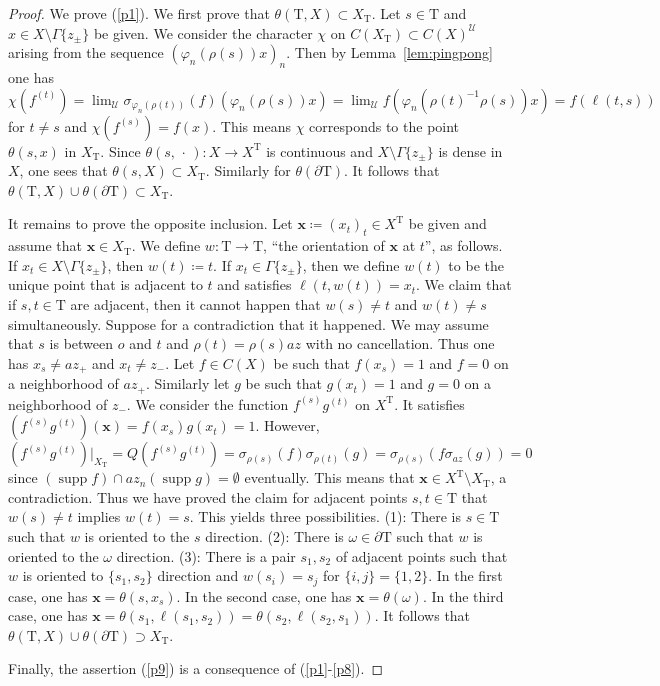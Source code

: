 \documentclass[10pt,a4paper]{amsart}
\DeclareMathOperator{\supp}{supp}
\newcommand{\Ga}{\Gamma}
\newcommand{\Tree}{\mathrm{T}}
\newcommand{\cU}{\mathcal{U}}
\newcommand{\vp}{\varphi}
\begin{document}
\begin{proof}
We prove (\ref{p1}). 
We first prove that $\theta(\Tree,X)\subset X_\Tree$. 
Let $s\in\Tree$ and $x\in X\setminus\Ga\{z_\pm\}$ be given.
We consider the character $\chi$ on 
$C(X_\Tree)\subset C(X)^\cU$ 
arising from the sequence $(\vp_n(\rho(s))x)_n$. 
Then by Lemma~\ref{lem:pingpong} one has 
\[
\chi(f^{(t)}) = \lim\nolimits_{\cU} \sigma_{\vp_n(\rho(t))}(f)(\vp_n(\rho(s))x) 
 = \lim\nolimits_{\cU} f(\vp_n(\rho(t)^{-1}\rho(s))x) 
 = f(\ell(t,s))
\]
for $t\neq s$ and $\chi(f^{(s)})=f(x)$. 
This means $\chi$ corresponds to 
the point $\theta(s,x)$ in $X_\Tree$. 
Since $\theta(s,\,\cdot\,)\colon X\to X^\Tree$ is 
continuous and $X\setminus\Ga\{z_\pm\}$ is dense in $X$, 
one sees that $\theta(s,X)\subset X_\Tree$. 
Similarly for $\theta(\partial\Tree)$. 
It follows that $\theta(\Tree,X)\cup\theta(\partial\Tree)\subset X_\Tree$. 

It remains to prove the opposite inclusion. 
Let $\mathbf{x} \coloneq (x_t)_t\in X^\Tree$ be given and assume that 
$\mathbf{x} \in X_\Tree$. 
We define $w\colon \Tree \to \Tree$, 
``the orientation of $\mathbf{x}$ at $t$'', as follows. 
If $x_t \in X\setminus\Ga\{z_\pm\}$, then $w(t) \coloneq t$. 
If $x_t \in \Ga\{ z_\pm\}$, then we define $w(t)$ to be the unique 
point that is adjacent to $t$ and satisfies $\ell(t,w(t))=x_t$. 
We claim that if $s,t\in\Tree$ are adjacent, then 
it cannot happen that $w(s)\neq t$ and $w(t)\neq s$ simultaneously. 
Suppose for a contradiction that it happened. 
We may assume that $s$ is between $o$ and $t$ 
and $\rho(t)=\rho(s) a z$ with no cancellation. 
Thus one has $x_s \neq az_+$ and $x_t \neq z_-$. 
Let $f\in C(X)$ be such that 
$f(x_s)=1$ and $f=0$ on a neighborhood of $az_+$. 
Similarly let $g$ be such that $g(x_t)=1$ and $g=0$ 
on a neighborhood of $z_-$. 
We consider the function $f^{(s)}g^{(t)}$ on $X^\Tree$. 
It satisfies $(f^{(s)}g^{(t)})( \mathbf{x} ) = f(x_s)g(x_t) = 1$.
However, 
\[
(f^{(s)}g^{(t)})|_{X_\Tree} = Q(f^{(s)}g^{(t)}) 
 = \sigma_{\rho(s)}(f)\sigma_{\rho(t)}(g)
 = \sigma_{\rho(s)}( f \sigma_{az}(g) ) = 0
\]
since $(\supp f)  \cap az_n(\supp g) = \emptyset$ eventually. 
This means that $\mathbf{x} \in X^\Tree\setminus X_\Tree$, 
a contradiction. 
Thus we have proved the claim for adjacent 
points $s,t\in\Tree$ that $w(s)\neq t$ implies $w(t)=s$. 
This yields three possibilities. 
(1): There is $s\in \Tree$ such that $w$ is oriented to 
the $s$ direction. 
(2): There is $\omega\in\partial\Tree$ such that 
$w$ is oriented to the $\omega$ direction. 
(3): There is a pair $s_1,s_2$ of adjacent points such that 
$w$ is oriented to $\{s_1,s_2\}$ direction 
and $w(s_i)=s_j$ for $\{ i, j \}=\{1,2\}$. 
In the first case, one has $\mathbf{x}=\theta(s,x_s)$. 
In the second case, one has $\mathbf{x}=\theta(\omega)$. 
In the third case, one has $\mathbf{x}=\theta(s_1,\ell(s_1,s_2))=\theta(s_2,\ell(s_2,s_1))$.
It follows that $\theta(\Tree,X)\cup\theta(\partial\Tree)\supset X_\Tree$. 

Finally, the assertion (\ref{p9}) is a consequence of (\ref{p1}-\ref{p8}).
\end{proof}
\end{document}
